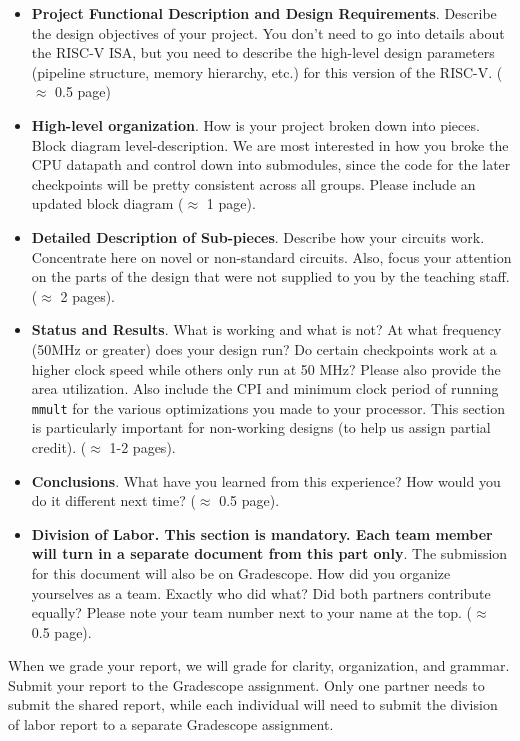 \documentclass[11pt]{article}
\begin{document}
\begin{itemize}
  \item \textbf{Project Functional Description and Design Requirements}. Describe the design objectives of your project.  You don't need to go into details about the RISC-V ISA, but you need to describe the high-level design parameters (pipeline structure, memory hierarchy, etc.) for this version of the RISC-V. ($\approx$ 0.5 page)
  \item \textbf{High-level organization}. How is your project broken down into pieces. Block diagram level-description. We are most interested in how you broke the CPU datapath and control
  down into submodules, since the code for the later checkpoints will be pretty consistent across all groups. Please include an updated block diagram ($\approx$ 1 page).
  \item \textbf{Detailed Description of Sub-pieces}. Describe how your circuits work. Concentrate here on novel or non-standard circuits. Also, focus your attention on the parts of the design that were not supplied to you by the teaching staff. ($\approx$ 2 pages).
  \item \textbf{Status and Results}. What is working and what is not? At what frequency (50MHz or greater) does your design run? Do certain checkpoints work at a higher clock speed while others only run at 50 MHz? Please also provide the area utilization. Also include the CPI and minimum clock period of running \verb|mmult| for the various optimizations you made to your processor. This section is particularly important for non-working designs (to help us assign partial credit). ($\approx$ 1-2 pages).
  \item \textbf{Conclusions}. What have you learned from this experience? How would you do it different next time? ($\approx$ 0.5 page).
  \item \textbf{Division of Labor. This section is mandatory. Each team member will turn in a separate document from this part only}. The submission for this document will also be on Gradescope. How did you organize yourselves as a team. Exactly who did what? Did both partners contribute equally? Please note your team number next to your name at the top. ($\approx$ 0.5 page).
\end{itemize}

When we grade your report, we will grade for clarity, organization, and grammar.
Submit your report to the Gradescope assignment.
Only one partner needs to submit the shared report, while each individual will need to submit the division of labor report to a separate Gradescope assignment.
\end{document}
